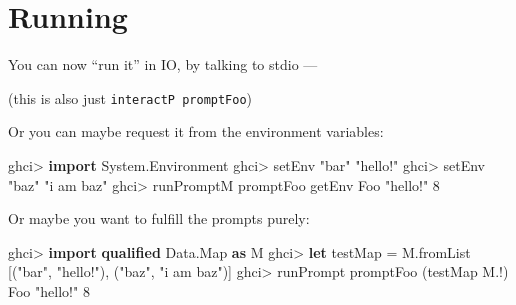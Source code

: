 \documentclass[]{article}
\newenvironment{Shaded}{}{}
\newcommand{\CommentTok}[1]{\textcolor[rgb]{0.38,0.63,0.69}{\textit{#1}}}
\newcommand{\DataTypeTok}[1]{\textcolor[rgb]{0.56,0.13,0.00}{#1}}
\newcommand{\DecValTok}[1]{\textcolor[rgb]{0.25,0.63,0.44}{#1}}
\newcommand{\FunctionTok}[1]{\textcolor[rgb]{0.02,0.16,0.49}{#1}}
\newcommand{\KeywordTok}[1]{\textcolor[rgb]{0.00,0.44,0.13}{\textbf{#1}}}
\newcommand{\NormalTok}[1]{#1}
\newcommand{\OperatorTok}[1]{\textcolor[rgb]{0.40,0.40,0.40}{#1}}
\newcommand{\OtherTok}[1]{\textcolor[rgb]{0.00,0.44,0.13}{#1}}
\newcommand{\StringTok}[1]{\textcolor[rgb]{0.25,0.44,0.63}{#1}}
\begin{document}
\section{Running}\label{running}

You can now ``run it'' in IO, by talking to stdio ---

\begin{Shaded}
\end{Shaded}

(this is also just \texttt{interactP\ promptFoo})

Or you can maybe request it from the environment variables:

\begin{Shaded}
\begin{Highlighting}[]
\NormalTok{ghci}\OperatorTok{\textgreater{}} \KeywordTok{import} \DataTypeTok{System.Environment}
\NormalTok{ghci}\OperatorTok{\textgreater{}}\NormalTok{ setEnv }\StringTok{"bar"} \StringTok{"hello!"}
\NormalTok{ghci}\OperatorTok{\textgreater{}}\NormalTok{ setEnv }\StringTok{"baz"} \StringTok{"i am baz"}
\NormalTok{ghci}\OperatorTok{\textgreater{}}\NormalTok{ runPromptM promptFoo getEnv}
\DataTypeTok{Foo} \StringTok{"hello!"} \DecValTok{8}
\end{Highlighting}
\end{Shaded}

Or maybe you want to fulfill the prompts purely:

\begin{Shaded}
\begin{Highlighting}[]
\NormalTok{ghci}\OperatorTok{\textgreater{}} \KeywordTok{import} \KeywordTok{qualified} \DataTypeTok{Data.Map} \KeywordTok{as} \DataTypeTok{M}
\NormalTok{ghci}\OperatorTok{\textgreater{}} \KeywordTok{let}\NormalTok{ testMap }\OtherTok{=}\NormalTok{ M.fromList [(}\StringTok{"bar"}\NormalTok{, }\StringTok{"hello!"}\NormalTok{), (}\StringTok{"baz"}\NormalTok{, }\StringTok{"i am baz"}\NormalTok{)]}
\NormalTok{ghci}\OperatorTok{\textgreater{}}\NormalTok{ runPrompt promptFoo (testMap }\OperatorTok{M.!}\NormalTok{)}
\DataTypeTok{Foo} \StringTok{"hello!"} \DecValTok{8}
\end{Highlighting}
\end{Shaded}
\end{document}
